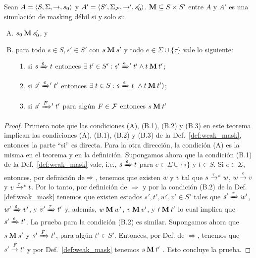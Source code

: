 \begin{theorem} \label{thm:weak_thm}
  Sean
$A =\langle S, \Sigma, \rightarrow, s_0 \rangle$ y $A' =\langle S', \Sigma_{\mathcal{F}}, \rightarrow', s'_0 \rangle$. 
$\mathbin{\mathbf{M}} \subseteq S \times S'$ entre $A$ y $A'$ es una simulación de masking débil si y solo si:

\begin{enumerate}[(A)]
  \item $s_0 \mathbin{\mathbf{M}} s'_0$, y
  \item para todo $s \in S, s' \in S'$ con $s \mathbin{\mathbf{M}} s'$ y todo $e \in \Sigma \cup \{\tau\}$ vale lo siguiente:

  \begin{enumerate}[(1)]
    \item si $s \xRightarrow{e} t$ entonces $\exists\; t' \in S': s' \mathrel{{\xRightarrow[]{\text{e}}}{}'} t' 
    \wedge t \mathbin{\mathbf{M}} t'$;

      \item si $s' \mathrel{{\xRightarrow[]{e}}{}'} t'$ entonces 
      $\exists \; t \in S: s \xRightarrow{e} t \
      \wedge t \mathbin{\mathbf{M}} t')$;

      \item si $s' \mathrel{{\xRightarrow[]{F}}{}'} t'$ para algún $F \in \mathcal{F}$ entonces 
      $s \mathbin{\mathbf{M}} t'$
  \end{enumerate}
\end{enumerate}

\end{theorem}

\noindent
\begin{proof}
	Primero note que las condiciones (A), (B.1), (B.2) y (B.3) en este teorema implican las condiciones (A), (B.1), (B.2) y (B.3)
 de la Def.~\ref{def:weak_mask}, entonces la parte ``si'' es directa. Para la otra dirección, la condición (A) es la misma en el teorema y en la definición.
 Supongamos ahora que la condición (B.1) de la Def.~\ref{def:weak_mask} vale, i.e.,
 $s \xRightarrow{e} t$ para $e \in \Sigma \cup \{\tau\}$ y $t \in S$. 
Si $e \in \Sigma$, entonces, por definición de$\Rightarrow$, tenemos que existen $w$ y $v$ tal que $s \mathrel{{\xrightarrow[]{\tau}}{}^*} w$, $w \xrightarrow{e} v$
 y $v \mathrel{{\xrightarrow[]{\tau}}{}^*} t$. Por lo tanto, por definición de $\Rightarrow$ y por la condición (B.2) de la Def. \ref{def:weak_mask} 
 tenemos que existen estados $s',t',w',v' \in S'$
 tales que $s' \xRightarrow{\tau} w'$, $w' \xRightarrow{e} v'$, y $v' \xRightarrow{\tau} t'$ y, 
 además, $w \mathbin{\mathbf{M}} w'$, $v \mathbin{\mathbf{M}} v'$, y $t \mathbin{\mathbf{M}} t'$ lo cual implica que$s' \xRightarrow{e} t'$. 
 La prueba para la condición (B.2) es similar.
 	Supongamos ahora que $s \mathbin{\mathbf{M}} s'$ y $s' \xRightarrow{F} t'$, para algún $t' \in S'$. Entonces, por Def. de 
$\Rightarrow$, tenemos que $s' \xrightarrow{F} t'$ y por Def.~\ref{def:weak_mask}
 tenemos $s \mathbin{\mathbf{M}} t'$ . Esto concluye la prueba.
 \qedhere 
 \end{proof} 
 
